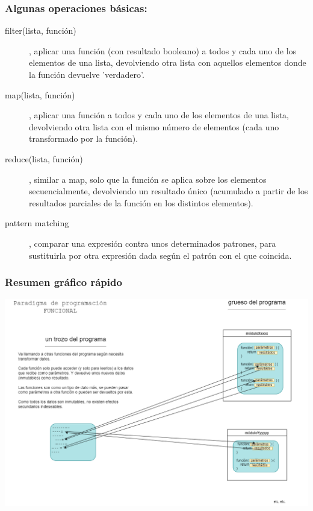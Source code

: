 \documentclass[spanish,12pt,a4paper,final,oneside]{book}
\begin{document}
\subsubsection*{Algunas operaciones básicas:}

\begin{description}

\item[filter(lista, función)], aplicar una función (con resultado booleano) a todos y cada uno de los elementos de una lista, devolviendo otra lista con aquellos elementos donde la función devuelve 'verdadero'.

\item[map(lista, función)], aplicar una función a todos y cada uno de los elementos de una lista, devolviendo otra lista con el mismo número de elementos (cada uno transformado por la función).

\item[reduce(lista, función)], similar a map, solo que la función se aplica sobre los elementos secuencialmente, devolviendo un resultado único (acumulado a partir de los resultados parciales de la función en los distintos elementos).

\item[pattern matching], comparar una expresión contra unos determinados patrones, para sustituirla por otra expresión dada según el patrón con el que coincida.

\end{description}


\subsubsection*{Resumen gráfico rápido}
\includegraphics[width=\textwidth]{Paradigma de programacion - FUNCIONAL}
\end{document}
